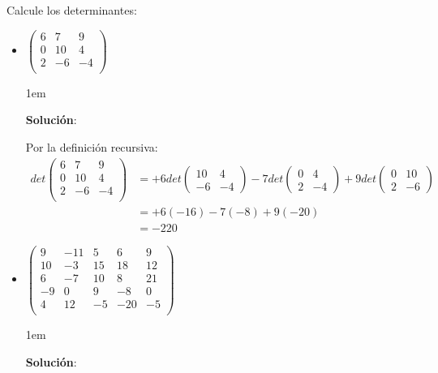 \documentclass[12pt, fleqn]{article}                             %
\newenvironment{SmallIndentation}[1][0.75em]                    %
        {\begin{adjustwidth}{#1}{}\begin{footnotesize}}             %
        {\end{footnotesize}\end{adjustwidth}}                       %
\theoremstyle{break}                                            %
\newcommand{\pVector}[1]                                        %
        { \ensuremath{\begin{pmatrix}#1\end{pmatrix}} }             %
\begin{document}
    Calcule los determinantes:
    \begin{itemize}
        
        \item 
            $\pVector{
                6 & 7 &9    \\ 
                0 & 10 & 4  \\
                2 & -6 & -4 \\
                }$

            \begin{SmallIndentation}[1em]
                \textbf{Solución}:

                Por la definición recursiva:
                \begin{align*}
                    det \pVector{
                        6 & 7 &9    \\ 
                        0 & 10 & 4  \\
                        2 & -6 & -4 \\
                    }
                    &=
                        + 6 det\pVector{10 & 4 \\ -6 & -4}
                        - 7 det\pVector{0 & 4 \\ 2 & -4}
                        + 9 det\pVector{0 & 10 \\ 2 & -6}       \\
                    &= 
                        + 6 (-16)
                        - 7 (-8)
                        + 9 (-20)                               \\
                    &= -220                                     
                \end{align*}
                
            \end{SmallIndentation}

        \item 
            $\pVector{
                9  & -11 & 5  & 6   & 9    \\ 
                10 & -3  & 15 & 18  & 12   \\ 
                6  & -7  & 10 & 8   & 21   \\ 
                -9 & 0   & 9  & -8  & 0    \\ 
                4  & 12  & -5 & -20 & -5   \\ 
                }$

            \begin{SmallIndentation}[1em]
                \textbf{Solución}:


\end{SmallIndentation}
\end{itemize}
\end{document}
